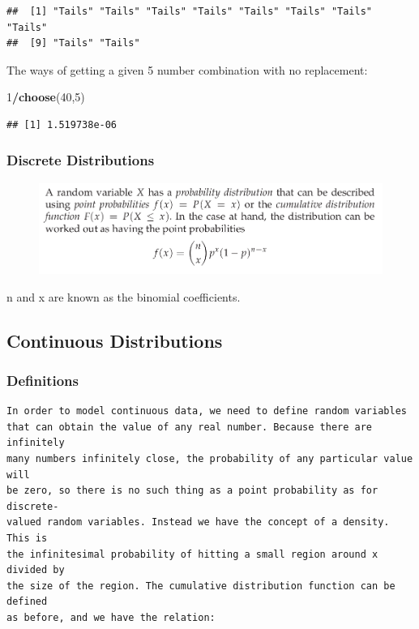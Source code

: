 \documentclass[]{article}
\newenvironment{Shaded}{\begin{snugshade}}{\end{snugshade}}
\newcommand{\KeywordTok}[1]{\textcolor[rgb]{0.13,0.29,0.53}{\textbf{#1}}}
\newcommand{\DecValTok}[1]{\textcolor[rgb]{0.00,0.00,0.81}{#1}}
\newcommand{\OperatorTok}[1]{\textcolor[rgb]{0.81,0.36,0.00}{\textbf{#1}}}
\newcommand{\NormalTok}[1]{#1}
\begin{document}
\begin{verbatim}
##  [1] "Tails" "Tails" "Tails" "Tails" "Tails" "Tails" "Tails" "Tails"
##  [9] "Tails" "Tails"
\end{verbatim}

The ways of getting a given 5 number combination with no replacement:

\begin{Shaded}
\begin{Highlighting}[]
\DecValTok{1}\OperatorTok{/}\KeywordTok{choose}\NormalTok{(}\DecValTok{40}\NormalTok{,}\DecValTok{5}\NormalTok{)}
\end{Highlighting}
\end{Shaded}

\begin{verbatim}
## [1] 1.519738e-06
\end{verbatim}

\subsubsection{Discrete Distributions}\label{discrete-distributions}

\begin{figure}
\centering
\includegraphics{img/discrete.png}
\caption{}
\end{figure}

n and x are known as the binomial coefficients.

\subsection{Continuous Distributions}\label{continuous-distributions}

\subsubsection{Definitions}\label{definitions}

\begin{verbatim}
In order to model continuous data, we need to define random variables
that can obtain the value of any real number. Because there are infinitely
many numbers infinitely close, the probability of any particular value will
be zero, so there is no such thing as a point probability as for discrete-
valued random variables. Instead we have the concept of a density. This is
the infinitesimal probability of hitting a small region around x divided by
the size of the region. The cumulative distribution function can be defined
as before, and we have the relation:
\end{verbatim}
\end{document}
